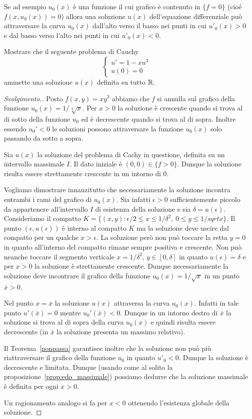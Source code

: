 Se ad esempio $u_0(x)$ è una funzione
il cui grafico è contenuto in $\{f=0\}$
(cioé $f(x,u_0(x))=0$) allora una soluzione $u(x)$ dell'equazione
differenziale può attraversare la curva $u_0(x)$ dall'alto verso il
basso nei punti in cui $u'_0(x)>0$ e dal basso verso l'alto nei punti
in cui $u'_0(x)<0$.

\begin{example}
Mostrare che il seguente problema di Cauchy
\[
\begin{cases}
  u'=1-x u^3\\
  u(0)=0
\end{cases}
\]
ammette una soluzione $u(x)$ definita su tutto ${\mathbb R}$.
\end{example}
%
\begin{proof}[Svolgimento.]
Posto $f(x,y)=xy^3$ abbiamo che $f$ si annulla sul grafico della
funzione $u_0(x)=1/\sqrt[3] x$. Per $x>0$ la soluzione è crescente
quando si trova al di sotto della funzione $u_0$ ed è decrescente
quando si trova al di sopra. Inoltre essendo $u_0'<0$ le soluzioni possono
attraversare la funzione $u_0(x)$ solo passando da sotto a
sopra.

Sia $u(x)$ la soluzione del problema di Cachy in questione, definita su
un intervallo massimale $I$. Il dato
iniziale è $(0,0)\in \{f>0\}$. Dunque la soluzione risulta essere
strettamente crescente in un intorno di $0$.

Vogliamo dimostrare innanzitutto che necessariamente la soluzione
incontra entrambi i rami del grafico di $u_0(x)$. Sia infatti
$\epsilon>0$ sufficientemente piccolo da appartenere all'intervallo
$I$ di
esistenza della soluzione e sia $\delta=u(\epsilon)$.
Consideriamo il compatto $K=\{(x,y):
\epsilon/2 \le x \le 1/\delta^2,\ 0\le y\le 1/sqrt{x}\}$. Il punto
$(\epsilon,u(\epsilon))$ è interno al compatto $K$ ma la soluzione deve
uscire dal compatto
per un qualche $x>\epsilon$.
La soluzione però non può toccare la
retta $y=0$ in quanto all'interno del compatto rimane sempre positiva
e crescente.
Non può neanche toccare il segmento verticale
$x=1/\delta^2$, $y\in[0,\delta]$ in quanto $u(\epsilon)=\delta$ e per
$x>0$ la soluzione è strettamente crescente.
Dunque necessariamente
la soluzione deve incontrare il grafico della funzione
$u_0(x)=1/\sqrt{x}$ in un punto $\bar x>0$.

Nel punto $x=\bar x$ la soluzione $u(x)$ attraversa la curva
$u_0(x)$. Infatti in tale punto $u'(\bar x)=0$ mentre $u_0'(\bar
x)<0$.
Dunque in un intorno destro di $\bar x$ la soluzione si trova
al di sopra della curva $u_0(x)$ e quindi risulta essere decrescente
(in $\bar x$ la soluzione presenta un massimo relativo).

Il Teorema~\ref{nonpassa} garantisce inoltre che la soluzione non
può più riattraversare il grafico della funzione $u_0$ in quanto
$u'_0<0$. Dunque la soluzione è decrescente e limitata.
Dunque (usando come al solito la proposizione~\ref{prop:edo_massimale})
possiamo dedurre che la soluzione massimale è definita per ogni $x>0$.

Un ragionamento analogo si fa per $x<0$ ottenendo l'esistenza globale
della soluzione.
\end{proof}

